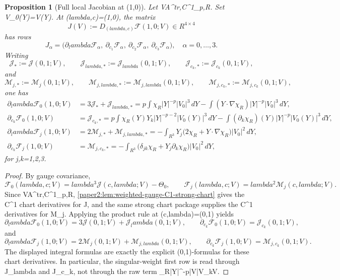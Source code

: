 \documentclass[11pt]{amsart}
\def\({}%
\def\){}%
\def\mathrm#1{#1}%
\def\mathbb#1{#1}%
\def\lambda{lambda}%
\theoremstyle{plain}
\newtheorem{proposition}[proposition]{Proposition}
\theoremstyle{definition}
\theoremstyle{remark}
\newcommand{\dd}{\mathrm d}
\newcommand{\RR}{\mathbb R}
\begin{document}
\begin{proposition}[Full local Jacobian at \((1,0)\)]\label{paper2:prop:full-jacobian}
Let \(V\in\mathcal A^{\rm tr,C^1}_{p,R}\).
Set \(V_0(Y)=V(Y)\).
At \((\lambda,c)=(1,0)\), the matrix
\[
J(V):=D_{(\lambda,c)}\mathcal F(1,0;V)\in \RR^{4\times4}
\]
has rows
\[
J_\alpha=\bigl(\partial_\lambda \mathcal F_\alpha,\ \partial_{c_1}\mathcal F_\alpha,\
\partial_{c_2}\mathcal F_\alpha,\ \partial_{c_3}\mathcal F_\alpha\bigr),\quad \alpha=0,\dots,3.
\]
Writing
\[
\mathcal J_*:=\mathcal J(0,1;V),\qquad
\mathcal J_{\lambda,*}:=\mathcal J_{\lambda}(0,1;V),\qquad
\mathcal J_{c_k,*}:=\mathcal J_{c_k}(0,1;V),
\]
and
\[
\mathcal M_{j,*}:=\mathcal M_j(0,1;V),\qquad
\mathcal M_{j,\lambda,*}:=\mathcal M_{j,\lambda}(0,1;V),\qquad
\mathcal M_{j,c_k,*}:=\mathcal M_{j,c_k}(0,1;V),
\]
one has
\begin{align}
\partial_\lambda \mathcal F_0(1,0;V)
&=
3\mathcal J_*+\mathcal J_{\lambda,*}
=p\int\chi_R|Y|^{-p}|V_0|^3\,\dd Y
-\int (Y\cdot\nabla\chi_R)|Y|^{-p}|V_0|^3\,\dd Y,\label{paper2:eq:jac00}\\
\partial_{c_k}\mathcal F_0(1,0;V)
&=\mathcal J_{c_k,*}
=p\int \chi_R(Y)Y_k|Y|^{-p-2}|V_0(Y)|^3\,dY
-\int (\partial_k\chi_R)(Y)|Y|^{-p}|V_0(Y)|^3\,dY,\label{paper2:eq:jac0k}\\
\partial_\lambda \mathcal F_j(1,0;V)
&=2\mathcal M_{j,*}+\mathcal M_{j,\lambda,*}
=-\int_{\RR^3}Y_j\bigl(2\chi_R+Y\cdot\nabla\chi_R\bigr)|V_0|^2\,\dd Y,\label{paper2:eq:jacjlambda}\\
\partial_{c_k}\mathcal F_j(1,0;V)
&=\mathcal M_{j,c_k,*}
=-\int_{\RR^3}\bigl(\delta_{jk}\chi_R+Y_j\partial_k\chi_R\bigr)|V_0|^2\,\dd Y,\label{paper2:eq:jacjk}
\end{align}
for \(j,k=1,2,3\).
\end{proposition}

\begin{proof}
By gauge covariance,
\[
\mathcal F_0(\lambda,c;V)=\lambda^3\mathcal J(c,\lambda;V)-\Theta_0,
\qquad
\mathcal F_j(\lambda,c;V)=\lambda^2\mathcal M_j(c,\lambda;V).
\]
Since \(V\in\mathcal A^{\rm tr,C^1}_{p,R}\),
\cref{paper2:lem:weighted-gauge-C1-strong-chart} gives the \(C^1\) chart
derivatives for \(\mathcal J\), and the same strong chart package supplies the
\(C^1\) derivatives for \(\mathcal M_j\).  Applying the product rule at
\((c,\lambda)=(0,1)\) yields
\[
\partial_\lambda\mathcal F_0(1,0;V)=3\mathcal J(0,1;V)+\mathcal J_\lambda(0,1;V),
\qquad
\partial_{c_k}\mathcal F_0(1,0;V)=\mathcal J_{c_k}(0,1;V),
\]
and
\[
\partial_\lambda\mathcal F_j(1,0;V)=2\mathcal M_j(0,1;V)+\mathcal M_{j,\lambda}(0,1;V),
\qquad
\partial_{c_k}\mathcal F_j(1,0;V)=\mathcal M_{j,c_k}(0,1;V).
\]
The displayed integral formulas are exactly the explicit \((0,1)\)-formulas for
these chart derivatives.  In particular, the singular-weight first row is read
through \(\mathcal J_\lambda\) and \(\mathcal J_{c_k}\), not through the raw
term \(\chi_R|Y|^{-p}|V|V\cdot\partial_kV\).
\end{proof}
\end{document}

